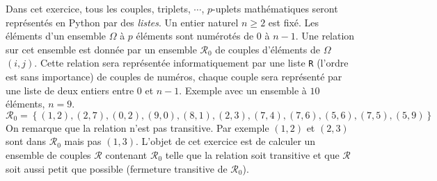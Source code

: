Dans cet exercice, tous les couples, triplets, $\cdots$, $p$-uplets mathématiques seront représentés en Python par des \emph{listes}. Un entier naturel $n\geq 2$ est fixé.\newline
Les éléments d'un ensemble $\Omega$ à $p$ éléments sont numérotés de $0$ à $n-1$. Une relation sur cet ensemble est donnée par un ensemble $\mathcal{R}_0$ de couples d'éléments de $\Omega$ $(i,j)$. Cette relation sera représentée informatiquement par une liste \texttt{R} (l'ordre est sans importance) de couples de numéros, chaque couple sera représenté par une liste de deux entiers entre $0$ et $n-1$.\newline
Exemple avec un ensemble à $10$ éléments, $n=9$.
\begin{displaymath}
  \mathcal{R}_0 = \left\lbrace (1,2), (2,7), (0,2), (9,0), (8,1), (2,3), (7,4), (7,6), (5,6), (7,5), (5,9)\right\rbrace 
\end{displaymath}
On remarque que la relation n'est pas transitive. Par exemple $(1,2)$ et $(2,3)$ sont dans $\mathcal{R }_0$ mais pas $(1,3)$.\newline
L'objet de cet exercice est de calculer un ensemble de couples $\mathcal{R}$ contenant  $\mathcal{R}_0$ telle que la relation soit transitive et que $\mathcal{R}$ soit aussi petit que possible (fermeture transitive de $\mathcal{R}_0$).

